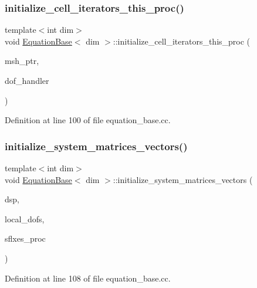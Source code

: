\subsubsection{\texorpdfstring{initialize\+\_\+cell\+\_\+iterators\+\_\+this\+\_\+proc()}{initialize\_cell\_iterators\_this\_proc()}}
{\footnotesize\ttfamily template$<$int dim$>$ \\
void \hyperlink{class_equation_base}{Equation\+Base}$<$ dim $>$\+::initialize\+\_\+cell\+\_\+iterators\+\_\+this\+\_\+proc (\begin{DoxyParamCaption}\item[{const std\+\_\+cxx11\+::shared\+\_\+ptr$<$ \hyperlink{class_mesh_generator}{Mesh\+Generator}$<$ dim $>$ $>$}]{msh\+\_\+ptr,  }\item[{const Do\+F\+Handler$<$ dim $>$ \&}]{dof\+\_\+handler }\end{DoxyParamCaption})}



Definition at line 100 of file equation\+\_\+base.\+cc.

\mbox{\label{class_equation_base_a25ff3b8e1a0c98dc5077e6afbac6606c}} 
\subsubsection{\texorpdfstring{initialize\+\_\+system\+\_\+matrices\+\_\+vectors()}{initialize\_system\_matrices\_vectors()}}
{\footnotesize\ttfamily template$<$int dim$>$ \\
void \hyperlink{class_equation_base}{Equation\+Base}$<$ dim $>$\+::initialize\+\_\+system\+\_\+matrices\+\_\+vectors (\begin{DoxyParamCaption}\item[{Dynamic\+Sparsity\+Pattern \&}]{dsp,  }\item[{Index\+Set \&}]{local\+\_\+dofs,  }\item[{std\+::vector$<$ Vector$<$ double $>$ $>$ \&}]{sflxes\+\_\+proc }\end{DoxyParamCaption})\hspace{0.3cm}{\ttfamily [virtual]}}



Definition at line 108 of file equation\+\_\+base.\+cc.

